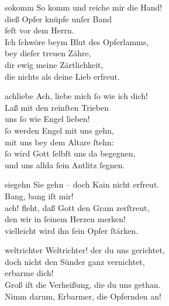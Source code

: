 \documentclass[tocstyle=ref-genre]{ees}
\begin{document}
{\begin{movement}{sokomm}
  \voice[Abel]
  So komm und reiche mir die Hand!\\
  dieß Opfer knüpfe unſer Band\\
  feſt vor dem Herrn.\\
  Ich ſchwöre beym Blut des Opferlamms,\\
  bey dieſer treuen Zähre,\\
  dir ewig meine Zärtlichkeit,\\
  die nichts als deine Lieb erfreut.
\end{movement}

\begin{movement}{achliebe}
  \voice[Abel]
  Ach, liebe mich ſo wie ich dich!\\
  Laß mit den reinſten Trieben\\
  uns ſo wie Engel lieben!\\
  ſo werden Engel mit uns gehn,\\
  mit uns bey dem Altare ſtehn:\\
  ſo wird Gott ſelbſt uns da begegnen,\\
  und uns allda ſein Antlitz ſegnen.
\end{movement}

\begin{movement}{siegehn}
  \voice[Adam]
  Sie gehn – doch Kain nicht erfreut.\\
  Bang, bang iſt mir!\\
  ach! fleht, daß Gott den Gram zerſtreut,\\
  den wir in ſeinem Herzen merken!\\
  vielleicht wird ihn ſein Opfer ſtärken.
\end{movement}

\begin{movement}{weltrichter}
  \voice[Chor]
  Weltrichter! der du uns gerichtet,\\
  doch nicht den Sünder ganz vernichtet,\\
  erbarme dich!\\
  Groß iſt die Verheißung, die du uns gethan.\\
  Nimm darum, Erbarmer, die Opfernden an!\\
\end{movement}

}
\end{document}
